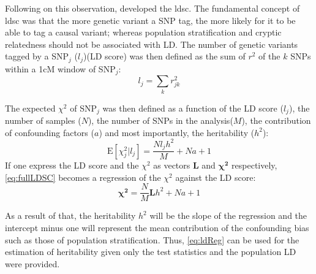 	Following on this observation, \citet{Bulik-Sullivan2015} developed the \gls{ldsc}.
	The fundamental concept of \gls{ldsc} was that the more genetic variant a \gls{SNP} tag, the more likely for it to be able to tag a causal variant; 
	whereas population stratification and cryptic relatedness should not be associated with \gls{LD}.
	The number of genetic variants tagged by a \gls{SNP}$_j$ ($l_j$)(\gls{LD} score) was then defined as the sum of $r^2$ of the $k$ \glspl{SNP} within a 1cM window of \gls{SNP}$_j$:
	\begin{equation}
	l_j = \sum_kr^2_{jk}
	\label{eq:ldScore}
	\end{equation}
	
	The expected $\chi^2$ of \gls{SNP}$_j$ was then defined as a function of the \gls{LD} score ($l_j$), the number of samples ($N$), the number of \glspl{SNP} in the analysis($M$), the contribution of confounding factors ($a$) and most importantly, the heritability ($h^2$):
	\begin{equation}
	\mathrm{E}[\chi^2_j | l_j] = \frac{Nl_jh^2}{M}+Na+1
	\label{eq:fullLDSC}
	\end{equation}
	If one express the \gls{LD} score and the $\chi^2$ as vectors $\boldsymbol{L}$ and $\boldsymbol{\chi^2}$ respectively, \cref{eq:fullLDSC} becomes a regression of the $\chi^2$ against the \gls{LD} score:
	\begin{equation}
	\boldsymbol{\chi^2}= \frac{N}{M}\boldsymbol{L}h^2+Na+1
	\label{eq:ldReg}
	\end{equation}
	
	As a result of that, the heritability $h^2$ will be the slope of the regression and the intercept minus one will represent the mean contribution of the confounding bias such as those of population stratification. 
	Thus, \cref{eq:ldReg} can be used for the estimation of heritability given only the test statistics and the population \gls{LD} were provided. 
	
